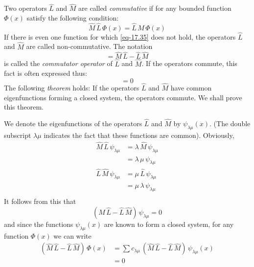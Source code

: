 \documentclass[a4paper,sfsidenotes,colorlinks=true]{tufte-book}
\numberwithin{equation}{section}
\numberwithin{figure}{section}
\begin{document}
Two  operators $\hat{L}$ and $\hat{M}$ are called
\emph{commutative} if for any bounded function $\Phi(x)$ satisfy the
following condition:
\begin{equation}%
\hat{M} \, \hat{L} \, \Phi (x) = \hat{L} \, \hat{M} \, \Phi (x)
\label{eq-17.35} 
\end{equation}
If there is even one function for which \ref{eq-17.35} does not hold,
the operators $\hat{L}$ and $\hat{M}$ are called non-commutative. The
notation 
\begin{equation*}%
[\hat{M}, \, \hat{L}] = \hat{M} \, \hat{L} - \hat{L} \, \hat{M} 
\end{equation*}
is called the \emph{commutator operator} of $\hat{L}$ and
$\hat{M}$. If the operators commute, this fact is often expressed
thus:
\begin{equation*}%
[\hat{M}, \, \hat{L}] = 0
\end{equation*}
The following \emph{theorem} holds: If the operators $\hat{L}$ and
$\hat{M}$ have common eigenfunctions forming a closed system, the
operators commute. We shall prove this theorem.

We denote the eigenfunctions of the operators $\hat{L}$ and $\hat{M}$
by $\psi_{\lambda \mu} (x)$. (The double subscript $\lambda \mu$
indicates the fact that these functions are common). Obviously,
\begin{equation*}%
\begin{split}
\hat{M}\,\hat{L} \, \psi_{\lambda \mu} & = \lambda \, \hat{M}
\,\psi_{\lambda \mu} \\
& = \lambda \, \mu \, \psi_{\lambda \mu} \\
\hat{L}\,\hat{M} \, \psi_{\lambda \mu} & = \mu \, \hat{L} \,
\psi_{\lambda \mu} \\
& =  \mu \,  \lambda \, \psi_{\lambda \mu} \\
\end{split}
\end{equation*}
It follows from this that 
\begin{equation*}%
  (\hat{M}\,\hat{L} - \hat{L} \, \hat{M}) \, \psi_{\lambda \mu} =0
\end{equation*}
and since the functions $\psi_{\lambda \mu} (x)$ are known to form a closed system, for any function $\Phi (x)$ we can write
\begin{equation*}%
\begin{split}
  (\hat{M}\,\hat{L} - \hat{L} \, \hat{M}) \, \Phi(x) & = \sum
  c_{\lambda \mu} \, (\hat{M}\,\hat{L} - \hat{L} \, \hat{M}) \,
  \psi_{\lambda \mu }(x) \\
& = 0
\end{split}
\end{equation*}
\end{document}
